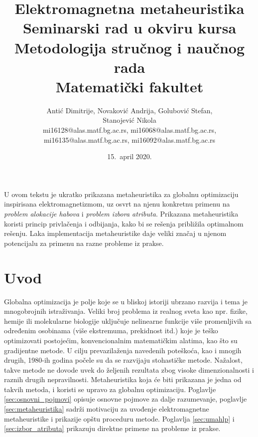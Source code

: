 \documentclass[a4paper]{article}
\begin{document}
\title{Elektromagnetna metaheuristika\\ \small{Seminarski rad u okviru kursa\\Metodologija stručnog i naučnog rada\\ Matematički fakultet}}

\author{Antić Dimitrije, Novaković Andrija, Golubović Stefan,\\ Stanojević Nikola\\\small{mi16128@alas.matf.bg.ac.rs, mi16068@alas.matf.bg.ac.rs},\\ \small{mi16135@alas.matf.bg.ac.rs, mi16092@alas.matf.bg.ac.rs}}

\date{15.~april 2020.}

\maketitle
{
U ovom tekstu je ukratko prikazana metaheuristika za globalnu optimi\-zaciju inspirisana elektromagnetizmom, uz osvrt na njenu konkretnu primenu na \textit{problem alokacije habova} i \textit{problem izbora atributa}. Prikazana metaheuristika koristi princip privlačenja i odbijanja, kako bi se rešenja približila optimalnom rešenju. Laka implementacija metaheuristike daje veliki značaj u njenom potencijalu za primenu na razne probleme iz prakse.}

\tableofcontents

\newpage

\section{Uvod}
\label{sec:uvod}

Globalna optimizacija je polje koje se u bliskoj istoriji ubrzano razvija i tema je mnogobrojnih istraživanja. Veliki broj problema iz realnog sveta kao npr. fizike, hemije ili molekularne biologije uključuje nelinearne funkcije više promenljivih sa određenim osobinama (više ekstremuma, prekidnost itd.) koje je teško optimizovati postojećim, konvencionalnim matematičkim alatima, kao što su gradijentne metode\cite{electromagnetism-like}.
U cilju prevazilaženja navedenih poteškoća, kao i mnogih drugih, 1980-ih godina počele su da se razvijaju stohastičke metode. Nažalost, takve metode ne dovode uvek do željenih rezultata zbog visoke dimenzionalnosti i raznih drugih nepravilnosti. Metaheuristika koja će biti prikazana je jedna od takvih metoda, i koristi se upravo za globalnu optimizaciju.
Poglavlje \ref{sec:osnovni_pojmovi} opisuje osnovne pojmove za dalje razumevanje, poglavlje \ref{sec:metaheuristika} sadrži motivaciju za uvođenje elektromagnetne metaheuristike i prikazije opštu proceduru metode. Poglavlja \ref{sec:umahlp} i \ref{sec:izbor_atributa} prikazuju direktne primene na probleme iz prakse.
\end{document}
